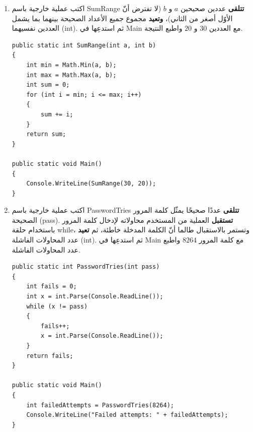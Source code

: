 \documentclass[14pt]{extarticle}
\begin{document}
\begin{enumerate}[resume, itemsep=1em]
\begin{boxSolution}
\begin{english}
\begin{verbatim}
public static void Main()
{
    int a = int.Parse(Console.ReadLine());
    int b = int.Parse(Console.ReadLine());
    int c = int.Parse(Console.ReadLine());
    int sum = PrintMinAndReturnSum(a, b, c);
    Console.WriteLine("Sum: " + sum);
}
\end{verbatim}
\end{english}
\end{boxSolution}
\fi
\filbreak

\item اكتب عملية خارجية باسم \textenglish{SumRange} \textbf{تتلقى} عددين صحيحين $a$ و $b$ (لا تفترض أنّ الأوّل أصغر من الثاني)، \textbf{وتعيد} مجموع جميع الأعداد الصحيحة بينهما بما يشمل العددين نفسيهما (\textenglish{int}). ثم استدعِها في \textenglish{Main} مع العددين $30$ و $20$ واطبع النتيجة.
\ifwithsols
\begin{boxSolution}
\begin{english}
\begin{verbatim}
public static int SumRange(int a, int b)
{
    int min = Math.Min(a, b);
    int max = Math.Max(a, b);
    int sum = 0;
    for (int i = min; i <= max; i++)
    {
        sum += i;
    }
    return sum;
}

public static void Main()
{
    Console.WriteLine(SumRange(30, 20));
}
\end{verbatim}
\end{english}
\end{boxSolution}
\fi
\filbreak

\item اكتب عملية خارجية باسم \textenglish{PasswordTries} \textbf{تتلقى} عددًا صحيحًا يمثّل كلمة المرور الصحيحة (\textenglish{pass}). \textbf{تستقبل} العملية من المستخدم محاولاته لإدخال كلمة المرور باستخدام حلقة \textenglish{while}، وتستمر بالاستقبال طالما أنّ الكلمة المدخلة خاطئة، ثم \textbf{تعيد} عدد المحاولات الفاشلة (\textenglish{int}). ثم استدعِها في \textenglish{Main} مع كلمة المرور $8264$ واطبع عدد المحاولات الفاشلة.
\ifwithsols
\begin{boxSolution}
\begin{english}
\begin{verbatim}
public static int PasswordTries(int pass)
{
    int fails = 0;
    int x = int.Parse(Console.ReadLine());
    while (x != pass)
    {
        fails++;
        x = int.Parse(Console.ReadLine());
    }
    return fails;
}

public static void Main()
{
    int failedAttempts = PasswordTries(8264);
    Console.WriteLine("Failed attempts: " + failedAttempts);
}
\end{verbatim}
\end{english}
\end{boxSolution}
\fi
\filbreak

\end{enumerate}
\end{document}
